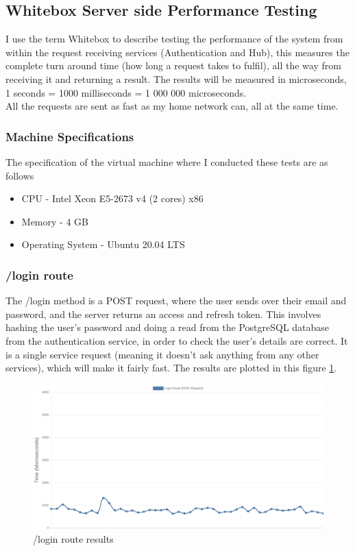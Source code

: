 \documentclass[titlepage]{article}
\begin{document}
\subsection{Whitebox Server side Performance Testing}
I use the term Whitebox to describe testing the performance of the system from within the request receiving services (Authentication and Hub), this measures the complete turn around time (how long a request takes to fulfil), all the way from receiving it and returning a result. The results will be measured in microseconds, 1 seconds = 1000 milliseconds = 1 000 000 microseconds. \\

All the requests are sent as fast as my home network can, all at the same time.

\subsubsection{Machine Specifications}
The specification of the virtual machine where I conducted these tests are as follows

\begin{itemize}
  \item CPU - Intel Xeon E5-2673 v4 (2 cores) x86
  \item Memory - 4 GB
  \item Operating System - Ubuntu 20.04 LTS
\end{itemize}

\pagebreak
\subsubsection{/login route}
The /login method is a POST request, where the user sends over their email and password, and the server returns an access and refresh token. This involves hashing the user's password and doing a read from the PostgreSQL database from the authentication service, in order to check the user's details are correct. It is a single service request (meaning it doesn't ask anything from any other services), which will make it fairly fast. The results are plotted in this figure \ref{login-test}.

\begin{figure}[h!]
\includegraphics[width=\textwidth]{../results/login.png}
  \caption{/login route results}
  \label{login-test}
\end{figure}
\end{document}
